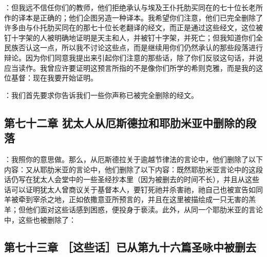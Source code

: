 ：但我远不信任你们的教师，他们拒绝承认与埃及王仆托肋买同在的七十位长老所作的译本是正确的；他们企图另造一种译本。我希望你们注意，他们已完全删除了许多由与仆托肋买同在的那七十位长老翻译的经文，而正是通过这些经文，这位被钉十字架的人被明确地证明是天主和人，并被钉十字架，并死亡；但我知道你们全民族否认这一点，所以我不讨论这些点，而是继续用你们仍然承认的那些段落进行辩论。因为你们同意我提出来引起你们注意的那些话，除了你们反驳这句话，并说应当读作。我曾应许要证明这预言所指的不是像你们所学的希则克雅，而是我的这位基督：现在我要开始证明。\par

：我们首先要求你告诉我们一些你声称已被完全删除的经文。\par


\subsection{第七十二章 犹太人从厄斯德拉和耶肋米亚中删除的段落}

：我照你的意思做。那么，从厄斯德拉关于逾越节律法的言论中，他们删除了以下内容：又从耶肋米亚的言论中，他们删除了以下内容：既然耶肋米亚言论中的这段话仍写在犹太人会堂中的一些圣经抄本里（因为被删去的时间不长），并且从这些话可以证明犹太人曾商议关于基督本人，要钉死祂并杀害祂，祂自己也被宣告如同羊被牵到宰杀之地，正如依撒意亚所预言的，并且在这里被描绘成一只无害的羔羊；但他们面对这些话感到困惑，便投身于亵渎。此外，从同一个耶肋米亚的言论中，这些也被删除了：\par


\subsection{第七十三章 ［这些话］已从第九十六篇圣咏中被删去}

